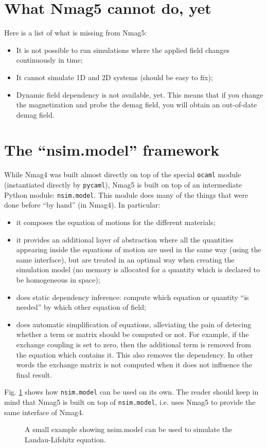 \documentclass[11pt,oneside,openany]{article}
\begin{document}
\section{What Nmag5 cannot do, yet} \label{sec:missing_from_nmag5}
Here is a list of what is missing from Nmag5:
\begin{itemize}
\item It is not possible to run simulations where the applied field
  changes continuously in time;
\item It cannot simulate 1D and 2D systems (should be easy to fix);
\item Dynamic field dependency is not available, yet. This means that
  if you change the magnetization and probe the demag field, you will
  obtain an out-of-date demag field.
\end{itemize}

\section{The ``nsim.model'' framework} \label{sec:nmag5_framework}
While Nmag4 was built almost directly on top of the special \verb|ocaml| module
(instantiated directly by \verb|pycaml|), Nmag5 is built on top of an
intermediate Python module: \verb|nsim.model|. This module does many of the
things that were done before ``by hand'' (in Nmag4). In particular:
\begin{itemize}
\item it composes the equation of motions for the different materials;
\item it provides an additional layer of abstraction where all the quantities
  appearing inside the equations of motion are used in the same way
  (using the same interface), but are treated in an optimal way when creating
  the simulation model (no memory is allocated for a quantity which is
  declared to be homogeneous in space);
\item does static dependency inference: compute which equation or quantity
  ``is needed'' by which other equation of field;
\item does automatic simplification of equations, alleviating the pain
  of detecing whether a term or matrix should be computed or not.
  For example, if the exchange coupling is set to zero, then the additional
  term is removed from the equation which contains it. This also removes
  the dependency. In other words the exchange matrix is not computed
  when it does not influence the final result.
\end{itemize}

Fig. \ref{fig:nsimmodel} shows how \verb|nsim.model| can be used on its own.
The reader should keep in mind that Nmag5 is built on top of \verb|nsim.model|,
i.e. uses Nmag5 to provide the same interface of Nmag4.
\begin{figure}[!p]

\caption{A small example showing nsim.model can be used to simulate
  the Landau-Lifshitz equation.}
\label{fig:nsimmodel}
\end{figure}
\end{document}
